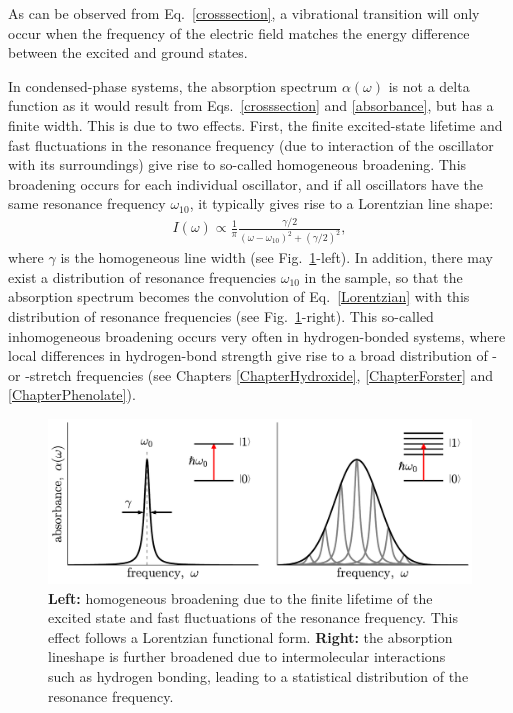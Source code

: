 As can be observed from Eq.\ \ref{crosssection}, a vibrational transition will only occur when the frequency of the electric field matches the energy difference between the excited and ground states. 


In condensed-phase systems, the absorption spectrum $\alpha(\omega)$ is not a delta function as it would result from Eqs.\ \ref{crosssection} and \ref{absorbance}, but has a finite width. This is due to two effects. First, the finite excited-state lifetime and fast fluctuations in the resonance frequency (due to interaction of the oscillator with its surroundings) give rise to so-called homogeneous broadening. This broadening occurs for each individual oscillator, and if all oscillators have the same resonance frequency $\omega_{10}$, it typically gives rise to a Lorentzian line shape:
\begin{eqnarray}
I (\omega ) \propto \frac{1}{\pi} \frac{\gamma/2}{ (\omega - \omega_{10})^2 + (\gamma/2)^2},
\label{Lorentzian}
\end{eqnarray}
where $\gamma$ is the homogeneous line width (see Fig.\ \ref{BroadeningFigure1}-left). In addition, there may exist a distribution of resonance frequencies $\omega_{10}$ in the sample, so that the absorption spectrum becomes the convolution of Eq.\ \ref{Lorentzian} with this distribution of resonance frequencies (see Fig.\ \ref{BroadeningFigure1}-right). This so-called inhomogeneous broadening occurs very often in hydrogen-bonded systems, where local differences in hydrogen-bond strength give rise to a broad distribution of - or -stretch frequencies (see Chapters \ref{ChapterHydroxide}, \ref{ChapterForster} and \ref{ChapterPhenolate}).



\begin{figure}[t!]
	\centering
	\includegraphics[width=0.95\figwidth]{chapters/Chapter3_Methods2/Graphs/LineShape.pdf} %
	\caption{\textbf{Left:} homogeneous broadening due to the finite lifetime of the excited state and fast fluctuations of the resonance frequency. This effect follows a Lorentzian functional form.  \textbf{Right:} the absorption lineshape is further broadened due to intermolecular interactions such as hydrogen bonding, leading to a statistical distribution of the resonance frequency.}
	\label{BroadeningFigure1}
\end{figure}





